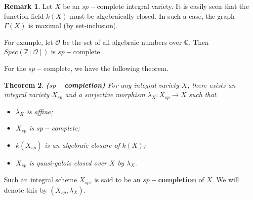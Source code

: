 \documentclass[12pt,twoside,reqno]{amsart}
\newtheorem{theorem}{Theorem}[section]
\theoremstyle{definition}
\newtheorem{remark}[theorem]{Remark}
\numberwithin{equation}{section}
\begin{document}
\begin{remark}
Let $X$ be an $sp-$complete integral variety. It is easily seen that the function field $k(X)$ must be algebraically closed. In such a case, the graph $\Gamma(X)$ is maximal (by set-inclusion).

For example, let $\mathcal{O}$ be the set of all algebraic numbers over $\mathbb{Q}$. Then $Spec(\mathbb{Z}[\mathcal{O}])$ is $sp-$complete.
\end{remark}

For the $sp-$complete, we have the following theorem.

\begin{theorem}
\emph{\textbf{($sp-$completion)}}
For any integral variety $X$, there exists an integral variety $X_{sp}$ and a surjective morphism $\lambda_{X}:X_{sp}\to X$ such that
\begin{itemize}
\item $\lambda_{X}$ is affine;

\item $X_{sp}$ is $sp-$complete;

\item $k(X_{sp})$ is an algebraic closure of $k(X)$;

\item $X_{sp}$ is quasi-galois closed over $X$ by $\lambda_{X}$.
\end{itemize}
\end{theorem}

Such an integral scheme $X_{sp}$, is said to be an \textbf{$sp-$completion} of $X$. We will denote this by $(X_{sp},\lambda_{X})$.
\end{document}
